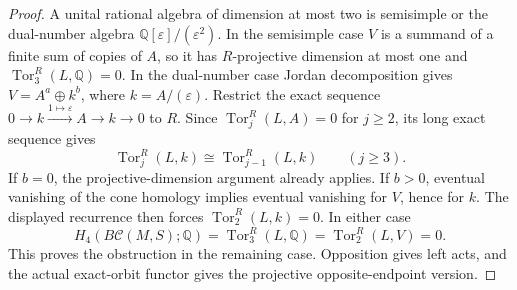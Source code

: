 \begin{proof}
A unital rational algebra of dimension at most two is
semisimple or the dual-number algebra
$\mathbb Q[\varepsilon]/(\varepsilon^2)$.
In the semisimple case $V$ is a summand of a finite
sum of copies of $A$, so it has $R$-projective dimension
at most one and $\operatorname{Tor}_3^R(L,\mathbb Q)=0$.
In the dual-number case Jordan decomposition gives
$V=A^a\oplus k^b$, where $k=A/(\varepsilon)$.
Restrict the exact sequence
$0\to k\xrightarrow{1\mapsto\varepsilon}A\to k\to0$
to $R$.  Since $\operatorname{Tor}_{j}^R(L,A)=0$ for
$j\geq2$, its long exact sequence gives
\[
 \operatorname{Tor}_{j}^R(L,k)
   \cong\operatorname{Tor}_{j-1}^R(L,k)
   \qquad(j\geq3).
\]
If $b=0$, the projective-dimension argument already
applies.  If $b>0$, eventual vanishing of the cone
homology implies eventual vanishing for $V$, hence
for $k$.  The displayed recurrence then forces
$\operatorname{Tor}_2^R(L,k)=0$.  In either case
\[
 H_4(B\mathcal C(M,S);\mathbb Q)
   =\operatorname{Tor}_3^R(L,\mathbb Q)
   =\operatorname{Tor}_2^R(L,V)=0.
\]
This proves the obstruction in the remaining case.
Opposition gives left acts, and the actual exact-orbit
functor gives the projective opposite-endpoint version.
\end{proof}

